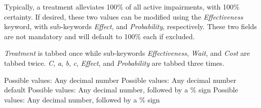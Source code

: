 \documentclass{article}
\begin{document}
Typically, a treatment alleviates 100\% of all active impairments, with 100\% certainty. If desired, these two values can be modified using the \textit{Effectiveness} keyword, with sub-keywords \textit{Effect}, and \textit{Probability}, respectively. These two fields are not mandatory and will default to 100\% each if excluded.

\textit{Treatment} is tabbed once while sub-keywords \textit{Effectiveness}, \textit{Wait}, and \textit{Cost} are tabbed twice. \textit{C}, \textit{a}, \textit{b}, \textit{c}, \textit{Effect}, and \textit{Probability} are tabbed three times. \newline




 \newline
\indent Possible values: \newline
\indent\indent Any decimal number \newline\newline
{} \newline
\indent  Possible values: \newline
\indent\indent  Any decimal number \newline
\indent\indent  default \newline\newline
{} \newline
\indent  Possible values: \newline
\indent\indent  Any decimal number, followed by a \% sign \newline\newline
{} \newline
\indent  Possible values: \newline
\indent\indent  Any decimal number, followed by a \% sign \newline
\end{document}
